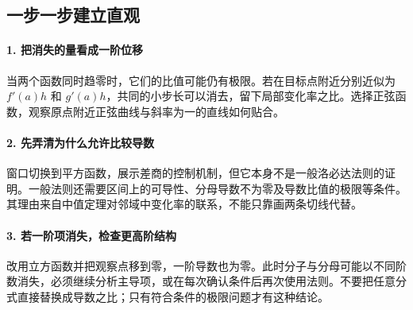 \subsection*{一步一步建立直观}

\paragraph{1. 把消失的量看成一阶位移}

当两个函数同时趋零时，它们的比值可能仍有极限。若在目标点附近分别近似为 $f'(a)h$ 和 $g'(a)h$，共同的小步长可以消去，留下局部变化率之比。选择正弦函数，观察原点附近正弦曲线与斜率为一的直线如何贴合。



\paragraph{2. 先弄清为什么允许比较导数}

窗口切换到平方函数，展示差商的控制机制，但它本身不是一般洛必达法则的证明。一般法则还需要区间上的可导性、分母导数不为零及导数比值的极限等条件。其理由来自中值定理对邻域中变化率的联系，不能只靠画两条切线代替。



\paragraph{3. 若一阶项消失，检查更高阶结构}

改用立方函数并把观察点移到零，一阶导数也为零。此时分子与分母可能以不同阶数消失，必须继续分析主导项，或在每次确认条件后再次使用法则。不要把任意分式直接替换成导数之比；只有符合条件的极限问题才有这种结论。
